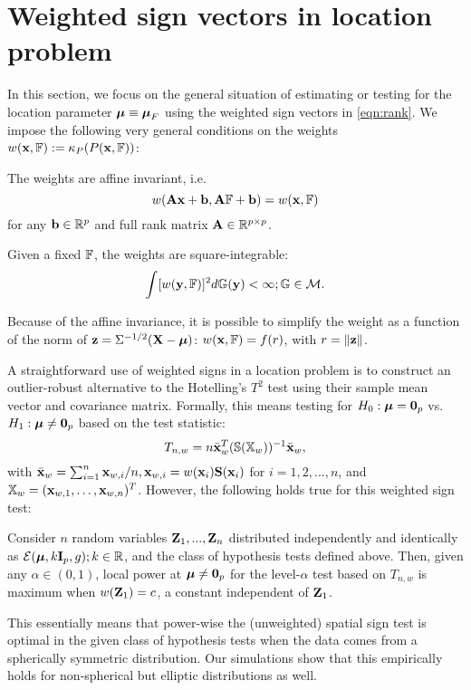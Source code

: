 \section{Weighted sign vectors in location problem}
\label{section:LocSection}
In this section, we focus on the general situation of estimating or testing for the location parameter ${\boldsymbol{\mu}} \equiv {\boldsymbol{\mu}}_F$ using the weighted sign vectors in \eqref{eqn:rank}. We impose the following very general conditions on the weights $w({\bf{x}}, {\mathbb{F}}) := \kappa_P(P({\bf{x}}, {\mathbb{F}}))$:

\vspace{1em}
 The weights are affine invariant, i.e.
%
$$
w({\mathbf{A}} {\bf{x}} + {\bf{b}}, {\mathbf{A}} {\mathbb{F}} + {\bf{b}}) = w({\bf{x}}, {\mathbb{F}})
$$
%
for any ${\bf{b}} \in {\mathbb{R}}^p$ and full rank matrix ${\mathbf{A}} \in {\mathbb{R}}^{p \times p}$.

 Given a fixed ${\mathbb{F}}$, the weights are square-integrable:
%
$$
\int [w({\bf{y}}, {\mathbb{F}})]^2 d{\mathbb{G}}({\bf{y}}) < \infty; {\mathbb{G}} \in \mathcal{M}.
$$

\vspace{1em}
\noindent Because of the affine invariance, it is possible to simplify the weight as a function of the norm of ${\bf{z}} = \Sigma^{-1/2} ({\mathbf{X}} - {\boldsymbol{\mu}})$: $w({\bf{x}}, {\mathbb{F}}) = f(r)$, with $r = \| {\bf{z}} \|$.

A straightforward use of weighted signs in a location problem is to construct an outlier-robust alternative to the Hotelling's $T^2$ test using their sample mean vector and covariance matrix. Formally, this means testing for $H_0: {\boldsymbol{\mu}} = {\bf 0}_p$ vs. $H_1:{\boldsymbol{\mu}} \neq {\bf 0}_p$  based on the test statistic:
%
$$
T_{n,w} = n \bar{{\bf{x}}}_w^T ( {\mathbb{S}} ({\mathbb{X}}_w))^{-1} \bar{{\bf{x}}}_w,
$$
%
with $\bar{{\bf{x}}}_w = \sum_{i=1}^n {\bf{x}}_{w,i}/n, {\bf{x}}_{w,i} = w({\bf{x}}_i ) {\mathbf{S}} ({\bf{x}}_i)$ for $i=1,2,...,n$, and ${\mathbb{X}}_w = ({\bf{x}}_{w,1}, \ldots, {\bf{x}}_{w,n})^T$. However, the following holds true for this weighted sign test:
%
\begin{Proposition}\label{proposition:SignTest}
Consider $n$ random variables ${\mathbf{Z}}_1,...,{\mathbf{Z}}_n$ distributed independently and identically as $\mathcal{E}( {\boldsymbol{\mu}}, k {\mathbf{I}}_p, g); k \in \mathbb R$, and the class of hypothesis tests defined above. Then, given any $\alpha \in (0,1)$, local power at ${\boldsymbol{\mu}} \neq {\bf 0}_p$ for the level-$\alpha$ test  based on $T_{n,w}$ is maximum when $w({\mathbf{Z}}_1) = c$, a constant independent of ${\mathbf{Z}}_1$.
\end{Proposition}
%
\noindent This essentially means that power-wise the (unweighted) spatial sign test \citep{OjaBook10} is optimal in the given class of hypothesis tests when the data comes from a spherically symmetric distribution. Our simulations show that this empirically holds for non-spherical but elliptic distributions as well.

